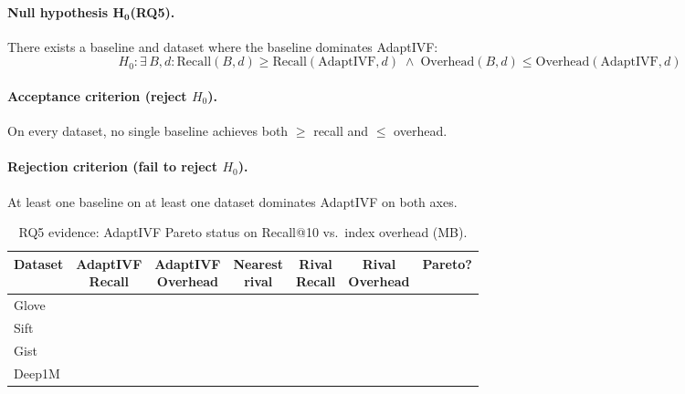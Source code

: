 \paragraph{Null hypothesis $\boldsymbol{H_0}$(RQ5).}
There exists a baseline and dataset where the baseline dominates AdaptIVF:
\[
  H_0: \exists\, B,d : \text{Recall}(B,d) \geq \text{Recall}(\text{AdaptIVF},d) \;\wedge\; \text{Overhead}(B,d) \leq \text{Overhead}(\text{AdaptIVF},d)
\]

\paragraph{Acceptance criterion (reject $H_0$).}
On every dataset, no single baseline achieves both $\geq$ recall and $\leq$
overhead.

\paragraph{Rejection criterion (fail to reject $H_0$).}
At least one baseline on at least one dataset dominates AdaptIVF on both
axes.

\begin{table}[h]
\centering
\caption{RQ5 evidence: AdaptIVF Pareto status on Recall@10 vs.\ index
         overhead (MB).}
\label{tab:appendix:rq5}
\begin{tabular}{lcccccc}
\toprule
Dataset & \makecell{AdaptIVF\\Recall} & \makecell{AdaptIVF\\Overhead} & \makecell{Nearest\\rival} & \makecell{Rival\\Recall} & \makecell{Rival\\Overhead} & Pareto? \\
\midrule
Glove  & \placeholder{\_\_\_} & \placeholder{\_\_\_} & \placeholder{\_\_\_} & \placeholder{\_\_\_} & \placeholder{\_\_\_} & \placeholder{\_\_\_} \\
Sift   & \placeholder{\_\_\_} & \placeholder{\_\_\_} & \placeholder{\_\_\_} & \placeholder{\_\_\_} & \placeholder{\_\_\_} & \placeholder{\_\_\_} \\
Gist   & \placeholder{\_\_\_} & \placeholder{\_\_\_} & \placeholder{\_\_\_} & \placeholder{\_\_\_} & \placeholder{\_\_\_} & \placeholder{\_\_\_} \\
Deep1M & \placeholder{\_\_\_} & \placeholder{\_\_\_} & \placeholder{\_\_\_} & \placeholder{\_\_\_} & \placeholder{\_\_\_} & \placeholder{\_\_\_} \\
\bottomrule
\end{tabular}
\end{table}

